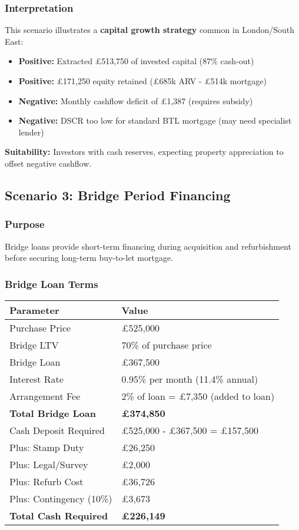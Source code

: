 \documentclass[11pt,a4paper]{article}
\begin{document}
\subsubsection{Interpretation}

This scenario illustrates a \textbf{capital growth strategy} common in London/South East:

\begin{itemize}
  \item \textbf{Positive:} Extracted £513,750 of invested capital (87\% cash-out)
  \item \textbf{Positive:} £171,250 equity retained (£685k ARV - £514k mortgage)
  \item \textbf{Negative:} Monthly cashflow deficit of £1,387 (requires subsidy)
  \item \textbf{Negative:} DSCR too low for standard BTL mortgage (may need specialist lender)
\end{itemize}

\textbf{Suitability:} Investors with cash reserves, expecting property appreciation to offset negative cashflow.

\subsection{Scenario 3: Bridge Period Financing}

\subsubsection{Purpose}

Bridge loans provide short-term financing during acquisition and refurbishment before securing long-term buy-to-let mortgage.

\subsubsection{Bridge Loan Terms}

\begin{longtable}{@{}p{5cm}p{9cm}@{}}
\toprule
\textbf{Parameter} & \textbf{Value} \\
\midrule
Purchase Price & £525,000 \\
Bridge LTV & 70\% of purchase price \\
Bridge Loan & £367,500 \\
Interest Rate & 0.95\% per month (11.4\% annual) \\
Arrangement Fee & 2\% of loan = £7,350 (added to loan) \\
\textbf{Total Bridge Loan} & \textbf{£374,850} \\
\addlinespace
Cash Deposit Required & £525,000 - £367,500 = £157,500 \\
Plus: Stamp Duty & £26,250 \\
Plus: Legal/Survey & £2,000 \\
Plus: Refurb Cost & £36,726 \\
Plus: Contingency (10\%) & £3,673 \\
\textbf{Total Cash Required} & \textbf{£226,149} \\
\bottomrule
\end{longtable}
\end{document}
